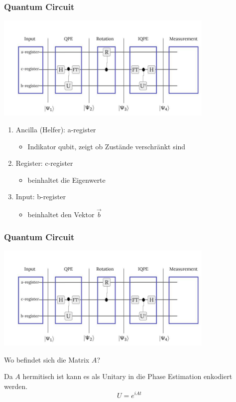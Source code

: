 \begin{frame}
    \frametitle{Quantum Circuit}
    \begin{center}
    \includegraphics[width=10.5cm]{img/hhl_circuit/hhl_circuit.jpg}
    \end{center}
    \begin{enumerate}
        \item Ancilla (Helfer): a-register
        \begin{itemize}
            \item Indikator qubit, zeigt ob Zustände verschränkt sind
        \end{itemize}

        \item Register: c-register
        \begin{itemize}
            \item beinhaltet die Eigenwerte
        \end{itemize}
        
        \item Input: b-register 
        \begin{itemize}
            \item beinhaltet den Vektor $\vec{b}$
        \end{itemize}
        
    \end{enumerate}
   \end{frame}

\begin{frame}
    \frametitle{Quantum Circuit}
    \begin{center}
    \includegraphics[width=10.5cm]{img/hhl_circuit/hhl_circuit.jpg}
    \end{center}

    \hfil

    Wo befindet sich die Matrix $A$?

    \hfil

    Da $A$ hermitisch ist kann es als Unitary in die Phase Estimation enkodiert werden. 
    $$U = e^{iAt}$$
\end{frame}

